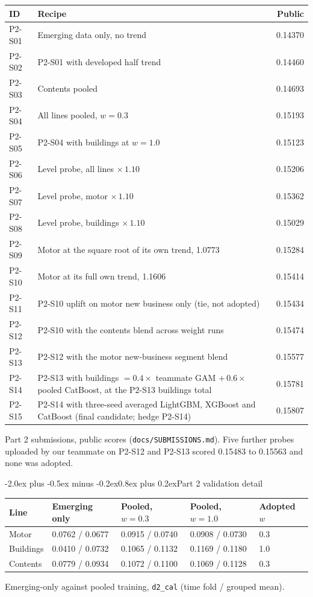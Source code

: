 \documentclass[11pt,a4paper]{article}
\makeatletter
\renewcommand\section{\@startsection{section}{1}{\z@}%
  {-2.0ex plus -0.5ex minus -0.2ex}{0.8ex plus 0.2ex}{\normalfont\large\bfseries}}
\newenvironment{fixedtable}%
  {\par\medskip\noindent\begin{minipage}{\linewidth}\def\@captype{table}\centering}%
  {\end{minipage}\par\medskip}
\newcommand{\code}[1]{\texttt{#1}}
\makeatother
\begin{document}
\begin{fixedtable}
\centering\small
\begin{tabularx}{\textwidth}{lXr}
\toprule
ID & Recipe & Public\\
\midrule
P2-S01 & Emerging data only, no trend & 0.14370\\
P2-S02 & P2-S01 with developed half trend & 0.14460\\
P2-S03 & Contents pooled & 0.14693\\
P2-S04 & All lines pooled, $w = 0.3$ & 0.15193\\
P2-S05 & P2-S04 with buildings at $w = 1.0$ & 0.15123\\
P2-S06 & Level probe, all lines $\times\,1.10$ & 0.15206\\
P2-S07 & Level probe, motor $\times\,1.10$ & 0.15362\\
P2-S08 & Level probe, buildings $\times\,1.10$ & 0.15029\\
P2-S09 & Motor at the square root of its own trend, 1.0773 & 0.15284\\
P2-S10 & Motor at its full own trend, 1.1606 & 0.15414\\
P2-S11 & P2-S10 uplift on motor new business only (tie, not adopted) & 0.15434\\
P2-S12 & P2-S10 with the contents blend across weight runs & 0.15474\\
P2-S13 & P2-S12 with the motor new-business segment blend & 0.15577\\
P2-S14 & P2-S13 with buildings $= 0.4\times$ teammate GAM $+\,0.6\times$ pooled CatBoost, at the P2-S13 buildings total & 0.15781\\
P2-S15 & P2-S14 with three-seed averaged LightGBM, XGBoost and CatBoost (final candidate; hedge P2-S14) & 0.15807\\
\bottomrule
\end{tabularx}
\caption{Part 2 submissions, public scores (\code{docs/SUBMISSIONS.md}). Five further probes uploaded by our teammate
on P2-S12 and P2-S13 scored 0.15483 to 0.15563 and none was adopted.}
\end{fixedtable}

\section{Part 2 validation detail}

\begin{fixedtable}
\centering\small
\begin{tabular}{lllll}
\toprule
Line & Emerging only & Pooled, $w = 0.3$ & Pooled, $w = 1.0$ & Adopted $w$\\
\midrule
Motor & 0.0762 / 0.0677 & 0.0915 / 0.0740 & 0.0908 / 0.0730 & 0.3\\
Buildings & 0.0410 / 0.0732 & 0.1065 / 0.1132 & 0.1169 / 0.1180 & 1.0\\
Contents & 0.0779 / 0.0934 & 0.1072 / 0.1100 & 0.1069 / 0.1128 & 0.3\\
\bottomrule
\end{tabular}
\caption{Emerging-only against pooled training, \code{d2\_cal} (time fold / grouped mean).}
\end{fixedtable}
\end{document}
